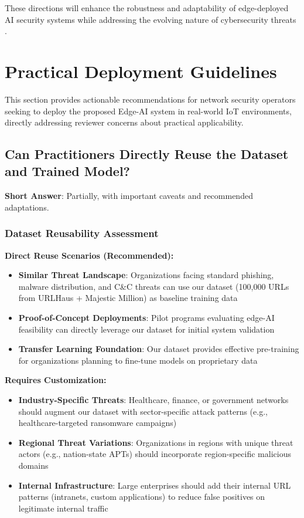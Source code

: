 \documentclass[conference]{IEEEtran}
\begin{document}
These directions will enhance the robustness and adaptability of edge-deployed AI security systems while addressing the evolving nature of cybersecurity threats \cite{ref_ai_security_future}.

\section{Practical Deployment Guidelines}

This section provides actionable recommendations for network security operators seeking to deploy the proposed Edge-AI system in real-world IoT environments, directly addressing reviewer concerns about practical applicability.

\subsection{Can Practitioners Directly Reuse the Dataset and Trained Model?}

\textbf{Short Answer}: Partially, with important caveats and recommended adaptations.

\subsubsection{Dataset Reusability Assessment}

\textbf{Direct Reuse Scenarios (Recommended):}
\begin{itemize}
\item \textbf{Similar Threat Landscape}: Organizations facing standard phishing, malware distribution, and C\&C threats can use our dataset (100,000 URLs from URLHaus + Majestic Million) as baseline training data
\item \textbf{Proof-of-Concept Deployments}: Pilot programs evaluating edge-AI feasibility can directly leverage our dataset for initial system validation
\item \textbf{Transfer Learning Foundation}: Our dataset provides effective pre-training for organizations planning to fine-tune models on proprietary data
\end{itemize}

\textbf{Requires Customization:}
\begin{itemize}
\item \textbf{Industry-Specific Threats}: Healthcare, finance, or government networks should augment our dataset with sector-specific attack patterns (e.g., healthcare-targeted ransomware campaigns)
\item \textbf{Regional Threat Variations}: Organizations in regions with unique threat actors (e.g., nation-state APTs) should incorporate region-specific malicious domains
\item \textbf{Internal Infrastructure}: Large enterprises should add their internal URL patterns (intranets, custom applications) to reduce false positives on legitimate internal traffic
\end{itemize}
\end{document}
